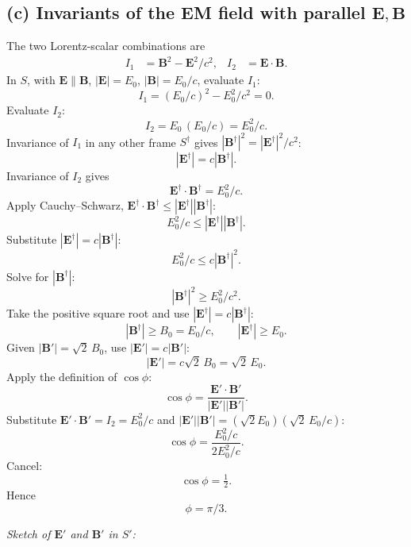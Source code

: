 \documentclass[11pt]{article}
\begin{document}
\subsection*{(c) Invariants of the EM field with parallel $\bm E,\bm B$}

The two Lorentz-scalar combinations are
\begin{align}
I_1 &= \bm B^2 - \bm E^2/c^2, & I_2 &= \bm E\cdot\bm B.
\end{align}
In $S$, with $\bm E\parallel\bm B$, $|\bm E|=E_0$, $|\bm B|=E_0/c$, evaluate $I_1$:
\[ I_1 = (E_0/c)^2 - E_0^2/c^2 = 0. \]
Evaluate $I_2$:
\[ I_2 = E_0\,(E_0/c) = E_0^2/c. \]
Invariance of $I_1$ in any other frame $S^\dagger$ gives $|\bm B^\dagger|^2 = |\bm E^\dagger|^2/c^2$:
\[ |\bm E^\dagger| = c|\bm B^\dagger|. \]
Invariance of $I_2$ gives
\[ \bm E^\dagger\cdot\bm B^\dagger = E_0^2/c. \]
Apply Cauchy--Schwarz, $\bm E^\dagger\cdot\bm B^\dagger\le|\bm E^\dagger||\bm B^\dagger|$:
\[ E_0^2/c \leq |\bm E^\dagger||\bm B^\dagger|. \]
Substitute $|\bm E^\dagger|=c|\bm B^\dagger|$:
\[ E_0^2/c \le c|\bm B^\dagger|^2. \]
Solve for $|\bm B^\dagger|$:
\[ |\bm B^\dagger|^2 \geq E_0^2/c^2. \]
Take the positive square root and use $|\bm E^\dagger|=c|\bm B^\dagger|$:
\[ \boxed{|\bm B^\dagger|\geq B_0=E_0/c,\qquad |\bm E^\dagger|\geq E_0.} \]
Given $|\bm B'|=\sqrt 2\,B_0$, use $|\bm E'|=c|\bm B'|$:
\[ |\bm E'| = c\sqrt 2\,B_0 = \sqrt 2\,E_0. \]
Apply the definition of $\cos\phi$:
\[ \cos\phi = \frac{\bm E'\cdot\bm B'}{|\bm E'||\bm B'|}. \]
Substitute $\bm E'\cdot\bm B' = I_2 = E_0^2/c$ and $|\bm E'||\bm B'| = (\sqrt 2 E_0)(\sqrt 2\,E_0/c)$:
\[ \cos\phi = \frac{E_0^2/c}{2E_0^2/c}. \]
Cancel:
\[ \cos\phi = \tfrac12. \]
Hence
\begin{equation}
\boxed{\phi = \pi/3.}
\end{equation}

\medskip
\noindent\emph{Sketch of $\bm E'$ and $\bm B'$ in $S'$:}
\begin{center}
\end{center}
\end{document}
